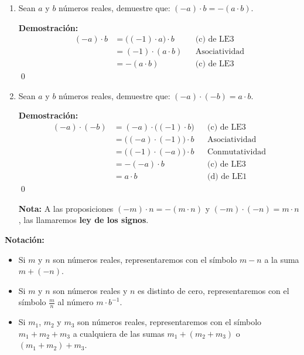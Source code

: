 \documentclass[11pt]{article}
\begin{document}
\begin{enumerate}[label=\alph*)]
        \item Sean $a$ y $b$ números reales, demuestre que: $ (-a) \cdot b = -(a \cdot b) $.
        
        \textbf{Demostración:} \begin{align*}
        (-a) \cdot b &= \bigl( \left(-1 \right) \cdot a \bigr) \cdot b && \text{(c) de LE3}\\
        &= (-1) \cdot (a \cdot b) && \text{Asociatividad}\\
        &= -(a \cdot b) && \text{(c) de LE3}
        \end{align*} \qed

        \item Sean $a$ y $b$ números reales, demuestre que: $ (-a) \cdot (-b) = a \cdot b $. 
        
        \textbf{Demostración:} \begin{align*}
            (-a) \cdot (-b) &= (-a) \cdot \bigl( (-1) \cdot b \bigr) && \text{(c) de LE3}\\
            &= \bigl( (-a) \cdot (-1) \bigr) \cdot b && \text{Asociatividad}\\
            &= \bigl( (-1) \cdot (-a) \bigr) \cdot b && \text{Conmutatividad}\\
            &= -(-a) \cdot b && \text{(c) de LE3}\\
            &= a \cdot b && \text{(d) de LE1}
        \end{align*} \qed

        \textbf{Nota:} A las proposiciones $ (-m) \cdot n = -(m \cdot n) $ y $ (-m) \cdot (-n) = m \cdot n $, las llamaremos \textbf{ley de los signos}.

            
    \end{enumerate}

\textbf{Notación:}

\begin{itemize}
    \item Si $m$ y $n$ son números reales, representaremos con el símbolo $m-n$ a la suma $m+ (-n)$.
    \item Si $m$ y $n$ son números reales y $n$ es distinto de cero, representaremos con el símbolo $ \frac{m}{n}$ al número $m \cdot b^{-1} $.
    \item Si $m_1$, $m_2$ y $m_3$ son números reales, representaremos con el símbolo $m_1+m_2+ m_3$ a cualquiera de las sumas $m_1+ \left(m_2+ m_3 \right)$ o $\left(m_1+ m_2 \right)+ m_3$.
\end{itemize}
\end{document}
